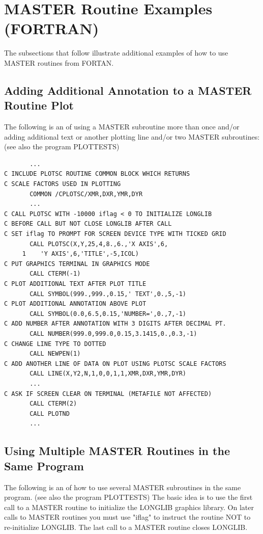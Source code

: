 \documentclass[11pt]{report}
\begin{document}
\section{MASTER Routine Examples (FORTRAN)}

The subsections that follow illustrate additional examples of how to use
MASTER routines from FORTAN.

\subsection{Adding Additional Annotation to a MASTER Routine Plot}

The following is an  of using a MASTER
subroutine more than once and/or adding additional text or
another plotting line and/or two MASTER subroutines: (see also the
program PLOTTESTS)


\begin{verbatim}
       ...
C INCLUDE PLOTSC ROUTINE COMMON BLOCK WHICH RETURNS
C SCALE FACTORS USED IN PLOTTING
       COMMON /CPLOTSC/XMR,DXR,YMR,DYR 
       ...
C CALL PLOTSC WITH -10000 iflag < 0 TO INITIALIZE LONGLIB
C BEFORE CALL BUT NOT CLOSE LONGLIB AFTER CALL
C SET iflag TO PROMPT FOR SCREEN DEVICE TYPE WITH TICKED GRID
       CALL PLOTSC(X,Y,25,4,8.,6.,'X AXIS',6,
     1    'Y AXIS',6,'TITLE',-5,ICOL)
C PUT GRAPHICS TERMINAL IN GRAPHICS MODE
       CALL CTERM(-1)
C PLOT ADDITIONAL TEXT AFTER PLOT TITLE
       CALL SYMBOL(999.,999.,0.15,' TEXT',0.,5,-1)
C PLOT ADDITIONAL ANNOTATION ABOVE PLOT
       CALL SYMBOL(0.0,6.5,0.15,'NUMBER=',0.,7,-1)
C ADD NUMBER AFTER ANNOTATION WITH 3 DIGITS AFTER DECIMAL PT.
       CALL NUMBER(999.0,999.0,0.15,3.1415,0.,0.3,-1)
C CHANGE LINE TYPE TO DOTTED
       CALL NEWPEN(1)
C ADD ANOTHER LINE OF DATA ON PLOT USING PLOTSC SCALE FACTORS
       CALL LINE(X,Y2,N,1,0,0,1,1,XMR,DXR,YMR,DYR)
       ...
C ASK IF SCREEN CLEAR ON TERMINAL (METAFILE NOT AFFECTED)
       CALL CTERM(2)
       CALL PLOTND
       ...
\end{verbatim}

\subsection{Using Multiple MASTER Routines in the Same Program}

The following is an  of how to use several MASTER
subroutines in the same program.  (see also the program PLOTTESTS)
The basic idea is to use the first call to a MASTER routine to
initialize the LONGLIB graphics library.  On later calls to MASTER
routines you must use "iflag" to instruct the routine NOT to
re-initialize LONGLIB.  The last call to a MASTER routine closes
LONGLIB.
\end{document}
